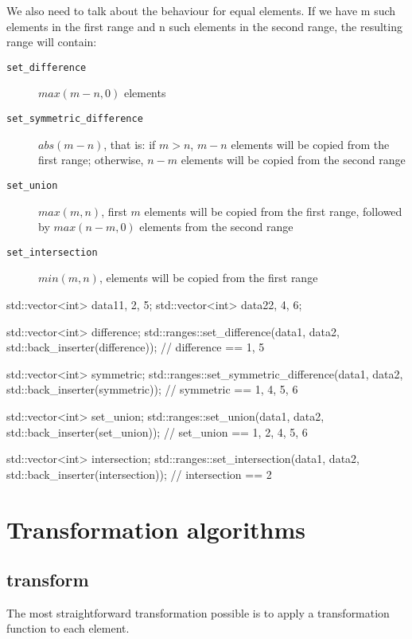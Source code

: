 We also need to talk about the behaviour for equal elements. If we have m such elements in the first range and n such elements in the second range, the resulting range will contain:


\begin{description}
   \item[\texttt{set\_difference}] $max(m-n,0)$ elements
   \item[\texttt{set\_symmetric\_difference}] $abs(m-n)$, that is: if $m>n$, $m-n$ elements will be copied from the first range; otherwise, $n-m$ elements will be copied from the second range
   \item[\texttt{set\_union}] $max(m,n)$, first $m$ elements will be copied from the first range, followed by $max(n-m,0)$ elements from the second range
   \item[\texttt{set\_intersection}] $min(m,n)$, elements will be copied from the first range
\end{description}

\begin{box-note}
\begin{cppcode}
std::vector<int> data1{1, 2, 5};
std::vector<int> data2{2, 4, 6};

std::vector<int> difference;
std::ranges::set_difference(data1, data2, std::back_inserter(difference));
// difference == {1, 5}

std::vector<int> symmetric;
std::ranges::set_symmetric_difference(data1, data2, std::back_inserter(symmetric));
// symmetric == {1, 4, 5, 6}

std::vector<int> set_union;
std::ranges::set_union(data1, data2, std::back_inserter(set_union));
// set_union == {1, 2, 4, 5, 6}

std::vector<int> intersection;
std::ranges::set_intersection(data1, data2, std::back_inserter(intersection));
// intersection == {2}
\end{cppcode}
\end{box-note}

\section{Transformation algorithms}

\subsection{transform}

The most straightforward transformation possible is to apply a transformation function to each element.

